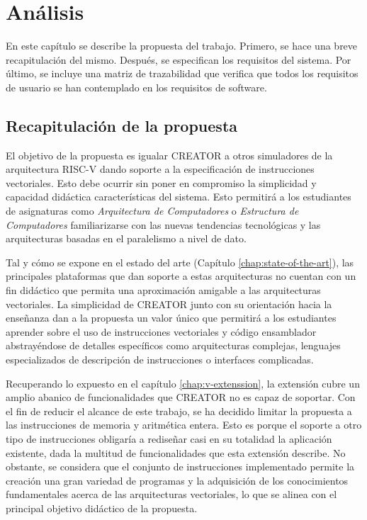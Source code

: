 \chapter{Análisis}\label{chap:analysis}
En este capítulo se describe la propuesta del trabajo. Primero, se hace una
breve recapitulación del mismo. Después, se especifican los requisitos del
sistema. Por último, se incluye una matriz de trazabilidad que verifica que
todos los requisitos de usuario se han contemplado en los requisitos de
software.

\section{Recapitulación de la propuesta}

El objetivo de la propuesta es igualar CREATOR a otros simuladores de la
arquitectura RISC-V dando soporte a la especificación de instrucciones
vectoriales. Esto debe ocurrir sin poner en compromiso la simplicidad y
capacidad didáctica características del sistema. Esto permitirá a los
estudiantes de asignaturas como \textit{Arquitectura de Computadores} o
\textit{Estructura de Computadores} familiarizarse con las nuevas tendencias
tecnológicas y las arquitecturas basadas en el paralelismo a nivel de dato.

Tal y cómo se expone en el estado del arte (Capítulo \ref{chap:state-of-the-art}), las
principales plataformas que dan soporte a estas arquitecturas no cuentan con un
fin didáctico que permita una aproximación amigable a las arquitecturas
vectoriales. La simplicidad de CREATOR junto con su orientación hacia la enseñanza dan a la
propuesta un valor único que permitirá a los estudiantes aprender sobre el uso
de instrucciones vectoriales y código ensamblador abstrayéndose de detalles
específicos como arquitecturas complejas, lenguajes especializados de
descripción de instrucciones o interfaces complicadas.

Recuperando lo expuesto en el capítulo \ref{chap:v-extenssion}, la extensión cubre
un amplio abanico de funcionalidades que CREATOR no es capaz de soportar. Con
el fin de reducir el alcance de este trabajo, se ha decidido limitar la
propuesta a las instrucciones de memoria y aritmética entera. Esto es porque el
soporte a otro tipo de instrucciones obligaría a rediseñar casi en su totalidad
la aplicación existente, dada la multitud de funcionalidades que esta extensión
describe. No obstante, se considera que el conjunto de instrucciones
implementado permite la creación una gran variedad de programas y la
adquisición de los conocimientos fundamentales acerca de las arquitecturas
vectoriales, lo que se alinea con el principal objetivo didáctico de la propuesta.

